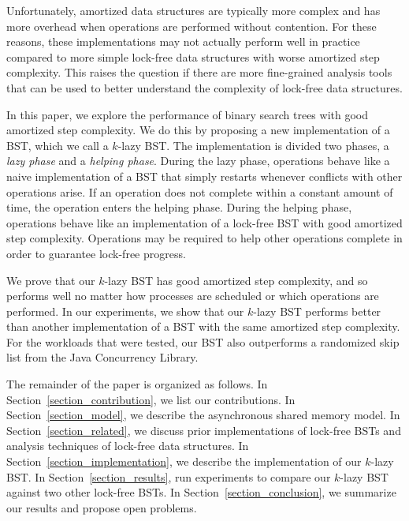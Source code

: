 \documentclass[letterpaper,twocolumn]{article}
\begin{document}
Unfortunately, amortized data structures are typically more complex and has more overhead when operations are performed without contention. For these reasons, these implementations may not actually perform well in practice compared to more simple lock-free data structures with worse amortized step complexity. This raises the question if there are more fine-grained analysis tools that can be used to better understand the complexity of lock-free data structures.

In this paper, we explore the performance of binary search trees with good amortized step complexity. We do this by proposing a new implementation of a BST, which we call a $k$-lazy BST. The implementation is divided two phases, a \textit{lazy phase} and a \textit{helping phase}. During the lazy phase, operations behave like a naive implementation of a BST that simply restarts whenever conflicts with other operations arise. If an operation does not complete within a constant amount of time, the operation enters the helping phase. During the helping phase, operations behave like an implementation of a lock-free BST with good amortized step complexity. Operations may be required to help other operations complete in order to guarantee lock-free progress. 

We prove that our $k$-lazy BST has good amortized step complexity, and so performs well no matter how processes are scheduled or which operations are performed. In our experiments, we show that our $k$-lazy BST performs better than another implementation of a BST with the same amortized step complexity. For the workloads that were tested, our BST also outperforms a randomized skip list from the Java Concurrency Library.

The remainder of the paper is organized as follows. In Section~\ref{section_contribution}, we list our contributions. In Section~\ref{section_model}, we describe the asynchronous shared memory model. In Section~\ref{section_related}, we discuss prior implementations of lock-free BSTs and analysis techniques of lock-free data structures. In Section~\ref{section_implementation}, we describe the implementation of our $k$-lazy BST. In Section~\ref{section_results}, run experiments to compare our $k$-lazy BST against two other lock-free BSTs. In Section~\ref{section_conclusion}, we summarize our results and propose open problems.
\end{document}
